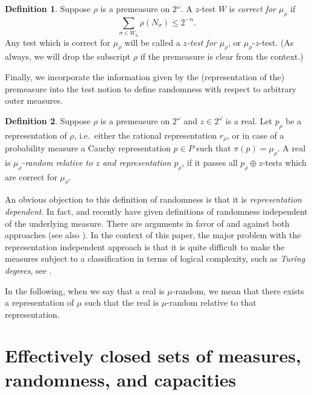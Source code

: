 \documentclass[11pt,reqno]{article}
\theoremstyle{plain}
\theoremstyle{definition}
\newtheorem{defn}{Definition}
\theoremstyle{remark}
\numberwithin{equation}{section}
\newcommand{\Cant}{\ensuremath{2^{\omega}}}
\newcommand{\Cyl}[1]{\ensuremath{N_{#1}}}
\begin{document}
\begin{defn} 
Suppose $\rho$ is a premeasure on $\Cant$. A $z$-test $W$ is \emph{correct for $\mu_\rho$} if 
		\begin{equation} \label{equ-correct-test}
			\sum_{\sigma \in W_n} \rho(\Cyl{\sigma}) \leq 2^{-n}.
		\end{equation}
	Any test which is correct for $\mu_\rho$ will be called a \emph{$z$-test for $\mu_\rho$}, or $\mu_\rho$-$z$-test. (As always, we will drop the subscript $\rho$ if the premeasure is clear from the context.) 
\end{defn}

Finally, we incorporate the information given by the (representation of the) premeasure into the test notion to define randomness with respect to arbitrary outer measures.

\begin{defn}\label{def-test-relative-to-measure}
	Suppose $\rho$ is a premeasure on $\Cant$ and $z \in \Cant$ is a real. Let $p_\rho$ be a representation of $\rho$, i.e.\ either the rational representation $r_\rho$, or in case of a probability measure a Cauchy representation $p \in P$ such that $\pi(p) = \mu_\rho$.
A real is \emph{$\mu_\rho$-random relative to $z$ and representation $p_\rho$}, if it passes all $p_\rho \oplus z$-tests which are correct for $\mu_\rho$.
\end{defn}

An obvious objection to this definition of randomness is that it is \emph{representation dependent}. In fact, \citet{levin:1976,levin:1984} and recently \citet{gacs:2005} have given definitions of randomness independent of the underlying measure. There are arguments in favor of and against both approaches (see also \citep{reimann:ta}). In the context of this paper, the major problem with the representation independent approach is that it is quite difficult to make the measures subject to a classification in terms of logical complexity, such as \emph{Turing degrees}, see \citep{miller:2004}.  

\medskip
In the following, when we say that a real is $\mu$-random, we mean that there exists a representation of $\mu$ such that the real is $\mu$-random relative to that representation.
	

% 
% 
\section{Effectively closed sets of measures, randomness, and capacities} \label{sec-rand}
\end{document}

